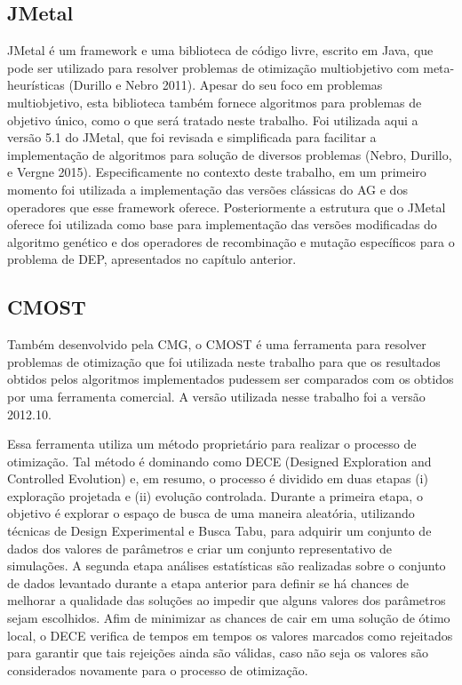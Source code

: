 \documentclass[12pt,a4paper]{report}
\begin{document}
\subsection{JMetal}

JMetal é um framework e uma biblioteca de código livre, escrito em Java, que pode ser utilizado para resolver problemas de otimização multiobjetivo com meta-heurísticas (Durillo e Nebro 2011). Apesar do seu foco em problemas multiobjetivo, esta biblioteca também fornece algoritmos para problemas de objetivo único, como o que será tratado neste trabalho. Foi utilizada aqui a versão 5.1 do JMetal, que foi revisada e simplificada para facilitar a implementação de algoritmos para solução de diversos problemas (Nebro, Durillo, e Vergne 2015). Especificamente no contexto deste trabalho, em um primeiro momento foi utilizada a implementação das versões clássicas do AG e dos operadores que esse framework oferece. Posteriormente a estrutura que o JMetal oferece foi utilizada como base para implementação das versões modificadas do algoritmo genético e dos operadores de recombinação e mutação específicos para o problema de DEP, apresentados no capítulo anterior. 

\subsection{CMOST}

Também desenvolvido pela CMG, o CMOST é uma ferramenta para resolver problemas de otimização que foi utilizada neste trabalho para que os resultados obtidos pelos algoritmos implementados pudessem ser comparados com os obtidos por uma ferramenta comercial. A versão utilizada nesse trabalho foi a versão 2012.10.

Essa ferramenta utiliza um método proprietário para realizar o processo de otimização. Tal método é dominando como DECE (Designed Exploration and Controlled Evolution) e, em resumo, o processo é dividido em duas etapas (i) exploração projetada e (ii) evolução controlada. Durante a primeira etapa, o objetivo é explorar o espaço de busca de uma maneira aleatória, utilizando técnicas de Design Experimental e Busca Tabu, para adquirir um conjunto de dados dos valores de parâmetros e criar um conjunto representativo de simulações. A segunda etapa análises estatísticas são realizadas sobre o conjunto de dados levantado durante a etapa anterior para definir se há chances de melhorar a qualidade das soluções ao impedir que alguns valores dos parâmetros sejam escolhidos. Afim de minimizar as chances de cair em uma solução de ótimo local, o DECE verifica de tempos em tempos os valores marcados como rejeitados para garantir que tais rejeições ainda são válidas, caso não seja os valores são considerados novamente para o processo de otimização.
\end{document}
